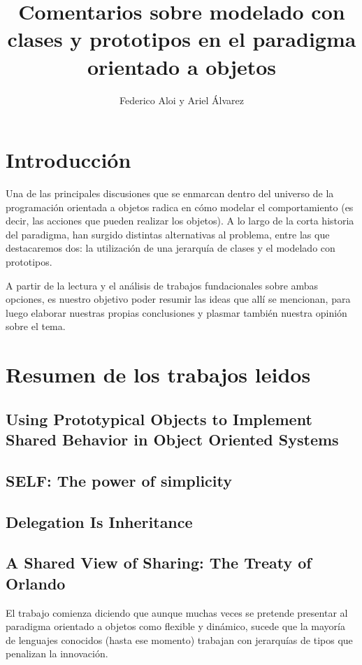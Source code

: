 \documentclass[a4paper,10pt]{article}
\title{Comentarios sobre modelado con clases y prototipos en el paradigma orientado a objetos}
\author{Federico Aloi y Ariel Álvarez}
\begin{document}
\maketitle

\section{Introducción}
Una de las principales discusiones que se enmarcan dentro del universo de la programación orientada a objetos radica en cómo modelar el comportamiento (es decir, las acciones que pueden realizar los objetos). A lo largo de la corta historia del paradigma, han surgido distintas alternativas al problema, entre las que destacaremos dos: la utilización de una jerarquía de clases y el modelado con prototipos.

A partir de la lectura y el análisis de trabajos fundacionales sobre ambas opciones, es nuestro objetivo poder resumir las ideas que allí se mencionan, para luego elaborar nuestras propias conclusiones y plasmar también nuestra opinión sobre el tema.

\section{Resumen de los trabajos leidos}

\subsection{Using Prototypical Objects to Implement Shared Behavior in Object Oriented Systems}
\subsection{SELF: The power of simplicity}
\subsection{Delegation Is Inheritance}

\subsection{A Shared View of Sharing: The Treaty of Orlando}
El trabajo comienza diciendo que aunque muchas veces se pretende presentar al paradigma orientado a objetos como flexible y dinámico, sucede que la mayoría de lenguajes conocidos (hasta ese momento) trabajan con jerarquías de tipos que penalizan la innovación.
\end{document}
